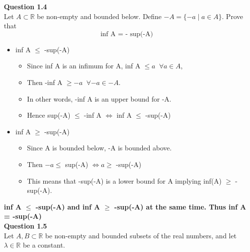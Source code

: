 \documentclass[12pt]{article}
\newcommand{\R}{\mathbb{R}}
\begin{document}
\noindent \textbf{Question 1.4}\\
Let $A \subset \R$ be non-empty and bounded below. Define $-A = \{-a\;|\;a \in A\}$. Prove that $$\text{inf A = - sup(-A)}$$
\begin{itemize}

    \item inf A $\le$ -sup(-A)
        \begin{itemize}
            \item Since inf A is an infimum for A, inf A $\le a\;\; \forall a \in A$, \item Then -inf A $\ge -a  \;\; \forall -a \in -A.$
            \item In other words, -inf A is an upper bound for -A.
            \item Hence sup(-A) $\le$ -inf A $\Leftrightarrow$ inf A $\le$ -sup(-A)
        \end{itemize}
    \item inf A $\ge$ -sup(-A)
        \begin{itemize}
            \item Since A is bounded below, -A is bounded above.
            \item Then $-a \le$ sup(-A) $\Leftrightarrow a \ge$ -sup(-A)
            \item This means that -sup(-A) is a lower bound for A implying inf(A) $\ge$ -sup(-A).
        \end{itemize}

\end{itemize}
\textbf{inf A $\le$ -sup(-A) and inf A $\ge$ -sup(-A) at the same time. Thus inf A = -sup(-A)}\\

\noindent \textbf{Question 1.5}\\
Let $A,B \subset \R$ be non-empty and bounded subsets of the real numbers, and let $\lambda \in \R$ be a constant.
\end{document}
